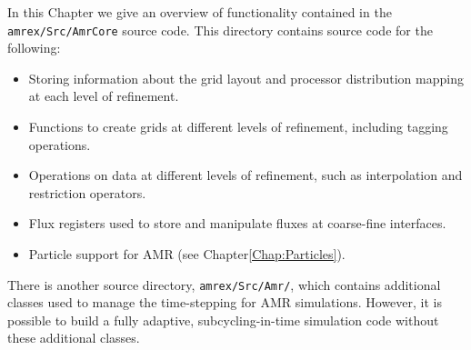 In this Chapter we give an overview of functionality contained in the {\tt amrex/Src/AmrCore} source code.
This directory contains source code for the following:
\begin{itemize}
\item Storing information about the grid layout and processor distribution mapping
at each level of refinement.
\item Functions to create grids at different levels of refinement, including tagging
operations.
\item Operations on data at different levels of refinement, such as interpolation and
restriction operators.
\item Flux registers used to store and manipulate fluxes at coarse-fine interfaces.
\item Particle support for AMR (see Chapter\ref{Chap:Particles}).
\end{itemize}
There is another source directory, {\tt amrex/Src/Amr/}, which contains
additional classes used to manage the time-stepping for AMR simulations.
However, it is possible to build a fully adaptive, subcycling-in-time simulation code
without these additional classes.

